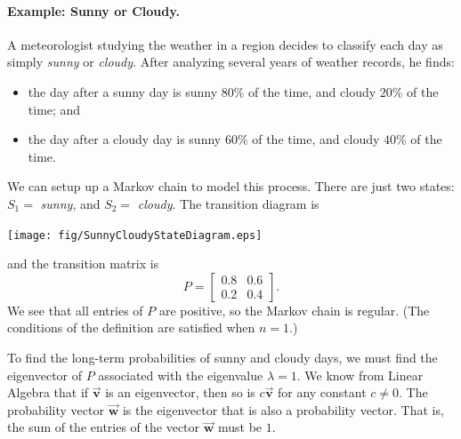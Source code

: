 \documentclass{book}
\newcommand{\BV}{\vec{\textbf{v}}}
\newcommand{\BW}{\vec{\textbf{w}}}
\begin{document}
\paragraph{Example: Sunny or Cloudy.}
A meteorologist studying the weather in a region
decides to classify each day as simply \emph{sunny}
or \emph{cloudy}.  After analyzing several years of weather records,
he finds:
\begin{itemize}
\item the day after a sunny day is
sunny $80$\% of the time, and cloudy $20$\% of the time; and
\item the day after a cloudy day is
sunny $60$\% of the time, and cloudy $40$\% of the time.
\end{itemize}
We can setup up a Markov chain to model this process.
There are just two states: $S_1=$ \emph{sunny}, and $S_2 = $ \emph{cloudy}.
The transition diagram is

\medskip
\centerline{%
\texttt{[image: fig/SunnyCloudyStateDiagram.eps]}
}

\medskip
\noindent
and the transition matrix is
\begin{equation}
  P = \begin{bmatrix}
          0.8 & 0.6 \\
	  0.2 & 0.4 
      \end{bmatrix}.
\end{equation}
We see that all entries of $P$ are positive, so the Markov
chain is regular.  (The conditions of the 
definition are satisfied when $n=1$.)

To find the long-term probabilities of sunny and cloudy days,
we must find the eigenvector of $P$ associated with the
eigenvalue $\lambda=1$. We know from Linear Algebra that
if $\BV$ is an eigenvector, then so is $c\BV$ for any
constant $c\ne0$.  The probability vector $\BW$ is the
eigenvector that is also a probability vector. That is,
the sum of the entries of the vector $\BW$ must be $1$.
\end{document}

